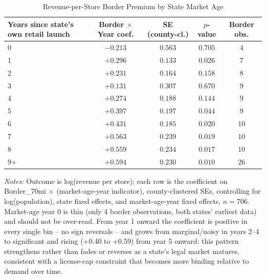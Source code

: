 \begin{table}[htbp]
\centering
\caption{Revenue-per-Store Border Premium by State Market Age}
\label{tab:revenue_perstore_eventstudy}
\begin{tabular}{lcccc}
\toprule
Years since state's own retail launch & Border $\times$ Year coef. & SE (county-cl.) & $p$-value & Border obs.\\
\midrule
0 & $-0.213$ & $0.563$ & $0.705$ & 4 \\
1 & $+0.296$ & $0.133$ & $0.026$ & 7 \\
2 & $+0.231$ & $0.164$ & $0.158$ & 8 \\
3 & $+0.131$ & $0.307$ & $0.670$ & 9 \\
4 & $+0.274$ & $0.188$ & $0.144$ & 9 \\
5 & $+0.397$ & $0.197$ & $0.044$ & 9 \\
6 & $+0.431$ & $0.185$ & $0.020$ & 10 \\
7 & $+0.563$ & $0.239$ & $0.019$ & 10 \\
8 & $+0.559$ & $0.234$ & $0.017$ & 10 \\
9+ & $+0.594$ & $0.230$ & $0.010$ & 26 \\
\bottomrule
\end{tabular}
\begin{minipage}{0.95\textwidth}
\vspace{0.3em}
\footnotesize
\textit{Notes:} Outcome is log(revenue per store); each row is the coefficient on
Border\_70mi $\times$ (market-age-year indicator), county-clustered SEs, controlling for log(population),
state fixed effects, and market-age-year fixed effects, $n=706$. Market-age year 0 is thin (only 4 border
observations, both states' earliest data) and should not be over-read. From year 1 onward the coefficient
is positive in every single bin -- no sign reversals -- and grows from marginal/noisy in years 2--4 to
significant and rising (+0.40 to +0.59) from year 5 onward: this pattern strengthens rather than fades or
reverses as a state's legal market matures, consistent with a license-cap constraint that becomes more
binding relative to demand over time.
\end{minipage}
\end{table}

